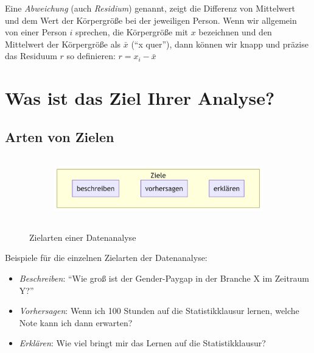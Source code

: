 \documentclass[
  a4paper,
  DIV=11]{scrreprt}
\providecommand{\tightlist}{%
  \setlength{\itemsep}{0pt}\setlength{\parskip}{0pt}}\usepackage{longtable,booktabs,array}
\theoremstyle{definition}
\theoremstyle{definition}
\theoremstyle{remark}
\begin{document}
Eine \emph{Abweichung} (auch \emph{Residium}) genannt, zeigt die
Differenz von Mittelwert und dem Wert der Körpergröße bei der jeweiligen
Person. Wenn wir allgemein von einer Person \(i\) sprechen, die
Körpergröße mit \(x\) bezeichnen und den Mittelwert der Körpergröße als
\(\bar{x}\) (``x quer''), dann können wir knapp und präzise das Residuum
\(r\) so definieren: \(r = x_i - \bar{x}\)

\hypertarget{was-ist-das-ziel-ihrer-analyse}{%
\section{Was ist das Ziel Ihrer
Analyse?}\label{was-ist-das-ziel-ihrer-analyse}}

\hypertarget{arten-von-zielen}{%
\subsection{Arten von Zielen}\label{arten-von-zielen}}

\begin{figure}

{\centering 

\begin{figure}[H]

{\centering \includegraphics[width=4.99in,height=1.09in]{./fragenstellen_files/figure-latex/mermaid-figure-5.png}

}

\end{figure}

}

\caption{\label{fig-ziele}Zielarten einer Datenanalyse}

\end{figure}

Beispiele für die einzelnen Zielarten der Datenanalyse:

\begin{itemize}
\tightlist
\item
  \emph{Beschreiben}: ``Wie groß ist der Gender-Paygap in der Branche X
  im Zeitraum Y?''
\item
  \emph{Vorhersagen}: Wenn ich 100 Stunden auf die Statistikklausur
  lernen, welche Note kann ich dann erwarten?
\item
  \emph{Erklären}: Wie viel bringt mir das Lernen auf die
  Statistikklausur?
\end{itemize}
\end{document}
